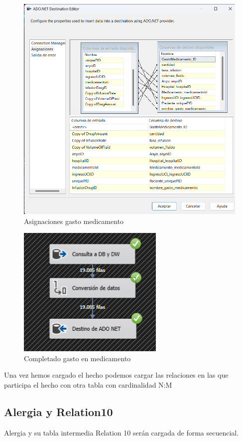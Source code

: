 \documentclass{article}
\begin{document}
	
	
	\begin{figure}[H]
		\centering
		\includegraphics[width=.7\linewidth]{./images/asignaciones/gasto_medicamento.png}
		\caption{Asignaciones gasto medicamento}
	\end{figure}
	\begin{figure}[H]
		\centering
		\includegraphics[width=.3\linewidth]{./images/completados/gasto_medicamento.png}
		\caption{Completado gasto en medicamento}
	\end{figure}
	
	Una vez hemos cargado el hecho podemos cargar las relaciones en las que participa el hecho con otra tabla con cardinalidad N:M
	\subsection{Alergia y Relation10}
	Alergia y su tabla intermedia Relation 10 serán cargada de forma secuencial.
\end{document}
